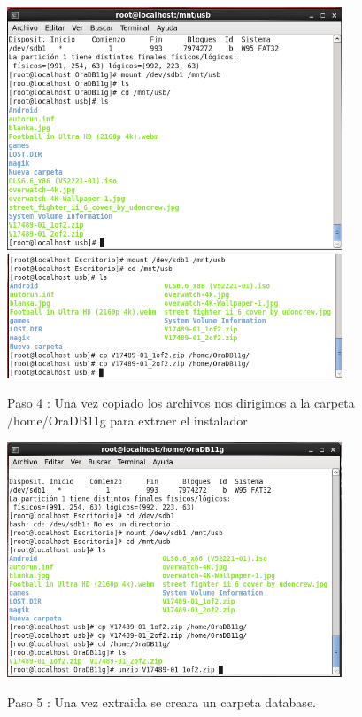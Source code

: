 \documentclass[12pt,letterpaper]{article}
\begin{document}
\begin{center}
\includegraphics[width=10cm]{./oraclelinux/5.png}
\includegraphics[width=10cm]{./oraclelinux/6.png}
\end{center}

Paso 4 : Una vez copiado los archivos nos dirigimos a la carpeta /home/OraDB11g  para extraer el instalador
\begin{center}
\includegraphics[width=10cm]{./oraclelinux/7.png}
\end{center}
Paso 5 : Una vez extraida se creara un carpeta database.
\end{document}
